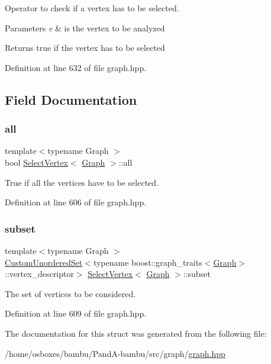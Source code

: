 Operator to check if a vertex has to be selected. 


\begin{DoxyParams}{Parameters}
{\em v} & is the vertex to be analyzed \\
\hline
\end{DoxyParams}
\begin{DoxyReturn}{Returns}
true if the vertex has to be selected 
\end{DoxyReturn}


Definition at line 632 of file graph.\+hpp.



\subsection{Field Documentation}
\mbox{\label{structSelectVertex_a93fdf1978ec2dfdeba3d4fe3bfc3d591}} 
\subsubsection{\texorpdfstring{all}{all}}
{\footnotesize\ttfamily template$<$typename Graph $>$ \\
bool \hyperlink{structSelectVertex}{Select\+Vertex}$<$ \hyperlink{structGraph}{Graph} $>$\+::all\hspace{0.3cm}{\ttfamily [private]}}



True if all the vertices have to be selected. 



Definition at line 606 of file graph.\+hpp.

\mbox{\label{structSelectVertex_abc4802dbc58ee00968ecddeb0c1048a3}} 
\subsubsection{\texorpdfstring{subset}{subset}}
{\footnotesize\ttfamily template$<$typename Graph $>$ \\
\hyperlink{classCustomUnorderedSet}{Custom\+Unordered\+Set}$<$typename boost\+::graph\+\_\+traits$<$\hyperlink{structGraph}{Graph}$>$\+::vertex\+\_\+descriptor$>$ \hyperlink{structSelectVertex}{Select\+Vertex}$<$ \hyperlink{structGraph}{Graph} $>$\+::subset\hspace{0.3cm}{\ttfamily [private]}}



The set of vertices to be considered. 



Definition at line 609 of file graph.\+hpp.



The documentation for this struct was generated from the following file\+:\begin{DoxyCompactItemize}
\item 
/home/osboxes/bambu/\+Pand\+A-\/bambu/src/graph/\hyperlink{graph_8hpp}{graph.\+hpp}\end{DoxyCompactItemize}
